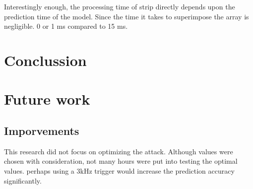 \documentclass{article}
\theoremstyle{definition}
\theoremstyle{remark}
\begin{document}
Interestingly enough, the processing time of strip directly depends upon the prediction time of the model. Since the time it takes to superimpose the array is negligible. 0 or 1 ms compared to 15 ms.
\section{Conclussion}
\section{Future work}
\subsection{Imporvements}
This research did not focus on optimizing the attack. Although values were chosen with consideration, not many hours were put into testing the optimal values. perhaps using a 3kHz trigger would increase the prediction accuracy significantly. 
\newpage


\end{document}
